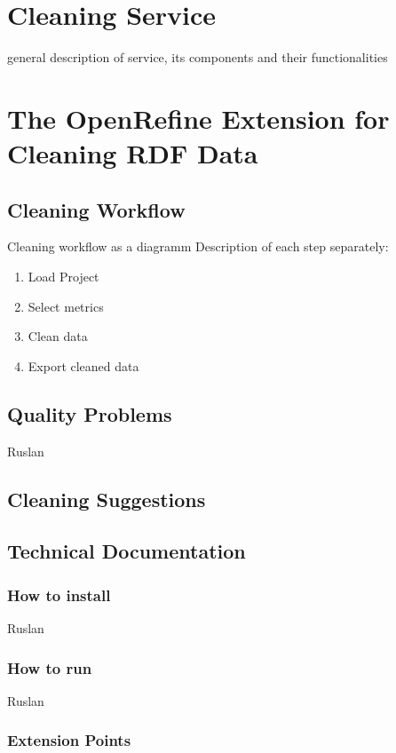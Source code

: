 

\section{Cleaning Service}

general description of service, its components and their functionalities


\section{The OpenRefine Extension for Cleaning RDF Data}
\label{sec:cleaning}

\subsection{Cleaning Workflow}
Cleaning workflow as a diagramm
Description of each step separately:
\begin{enumerate}
	
\item Load Project
\item Select metrics
\item Clean data
 \item Export cleaned data
\end{enumerate}
\subsection{Quality Problems}
Ruslan
\subsection{Cleaning Suggestions}


\subsection{Technical Documentation}


\subsubsection{How to install}
Ruslan
\subsubsection{How to run}
Ruslan
\


\subsubsection{Extension Points}



